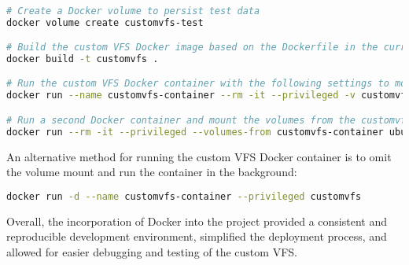 \begin{lstlisting}[language=bash, basicstyle=\ttfamily\small]

# Create a Docker volume to persist test data
docker volume create customvfs-test

# Build the custom VFS Docker image based on the Dockerfile in the current directory
docker build -t customvfs .

# Run the custom VFS Docker container with the following settings to mount the customvfs-test volume and see the debug output
docker run --name customvfs-container --rm -it --privileged -v customvfs-test:/mnt/test customvfs

# Run a second Docker container and mount the volumes from the customvfs-container to test the VFS
docker run --rm -it --privileged --volumes-from customvfs-container ubuntu:20.04 bash
\end{lstlisting}

An alternative method for running the custom VFS Docker container is to omit the volume mount and run the container in the background:

\begin{lstlisting}[language=bash, basicstyle=\ttfamily\small]
docker run -d --name customvfs-container --privileged customvfs
\end{lstlisting}

Overall, the incorporation of Docker into the project provided a consistent and reproducible development environment, simplified the deployment process, and allowed for easier debugging and testing of the custom VFS.
